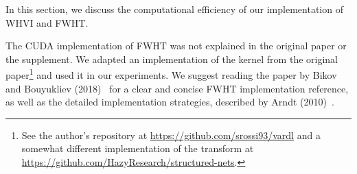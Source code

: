 
In this section, we discuss the computational efficiency of our implementation of WHVI and FWHT\@.


The CUDA implementation of FWHT was not explained in the original paper or the supplement.
We adapted an implementation of the kernel from the original paper\footnote{See the author's repository at \url{https://github.com/srossi93/vardl} and a somewhat different implementation of the transform at \url{https://github.com/HazyResearch/structured-nets}.} and used it in our experiments.
We suggest reading the paper by Bikov and Bouyukliev (2018)~\cite{bikov2018parallel} for a clear and concise FWHT implementation reference, as well as the detailed implementation strategies, described by Arndt (2010)~\cite{arndt2010matters}.
